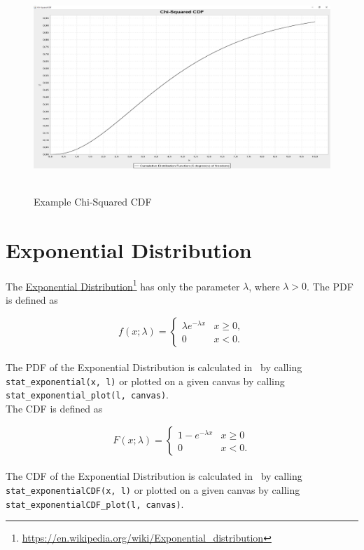 		\begin{figure}[H]
			\centering
			\includegraphics[width=1\textwidth]{Figures/implemented_functions/chi_squared_cdf}~\\
			\caption{Example Chi-Squared CDF}
			\label{fig:chi_squared_cdf}
		\end{figure}


	\section{Exponential Distribution}

		The \href{https://en.wikipedia.org/wiki/Exponential_distribution}{Exponential Distribution}\footnote{\url{https://en.wikipedia.org/wiki/Exponential_distribution}} has only the parameter $\lambda$, where $\lambda > 0$. The \ac{PDF} is defined as

		$$f(x;\lambda) = \begin{cases} \lambda e^{-\lambda x} & x \ge 0, \\ 0 & x < 0. \end{cases}$$
		\\[0.3cm]
		The \ac{PDF} of the Exponential Distribution is calculated in \setlx\ by calling \lstinline{stat_exponential(x, l)} or plotted on a given canvas by calling \lstinline{stat_exponential_plot(l, canvas)}.
		\\[0.3cm]
		The \ac{CDF} is defined as

		$$F(x;\lambda) = \begin{cases} 1-e^{-\lambda x} & x \ge 0 \\ 0 & x < 0. \end{cases}$$
		\\[0.3cm]
		The \ac{CDF} of the Exponential Distribution is calculated in \setlx\ by calling \lstinline{stat_exponentialCDF(x, l)} or plotted on a given canvas by calling \lstinline{stat_exponentialCDF_plot(l, canvas)}.

